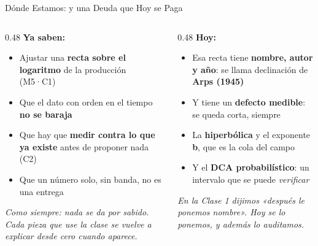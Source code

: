\documentclass[aspectratio=169, 11pt]{beamer}
\begin{document}
\begin{frame}[shrink=8]{Dónde Estamos: y una Deuda que Hoy se Paga}
  \vspace{-4pt}
  \begin{columns}[T]
    \begin{column}{0.48\textwidth}
      {\small\color{arcaDark}\bfseries\faCheckCircle\hspace{5pt}Ya saben:}
      \vspace{4pt}
      {\footnotesize\color{textMuted}
      \begin{itemize}\setlength{\itemsep}{3pt}
        \item[{\color{codeGreen}\scriptsize\faCheck}]
          Ajustar una \textbf{recta sobre el logaritmo} de la producción (M5·C1)
        \item[{\color{codeGreen}\scriptsize\faCheck}]
          Que el dato con orden en el tiempo \textbf{no se baraja}
        \item[{\color{codeGreen}\scriptsize\faCheck}]
          Que hay que \textbf{medir contra lo que ya existe} antes de proponer nada (C2)
        \item[{\color{codeGreen}\scriptsize\faCheck}]
          Que un número solo, sin banda, no es una entrega
      \end{itemize}
      }
      \vspace{5pt}
      {\scriptsize\color{textMuted}\itshape
        Como siempre: nada se da por sabido. Cada pieza que use la clase
        se vuelve a explicar desde cero cuando aparece.}
    \end{column}
    \begin{column}{0.48\textwidth}
      {\small\color{arcaDark}\bfseries\faForward\hspace{5pt}Hoy:}
      \vspace{4pt}
      {\footnotesize\color{textMuted}
      \begin{itemize}\setlength{\itemsep}{3pt}
        \item[{\color{arcaRed}\scriptsize\faArrowRight}]
          Esa recta tiene \textbf{nombre, autor y año}: se llama declinación de
          \textbf{Arps (1945)}
        \item[{\color{arcaRed}\scriptsize\faArrowRight}]
          Y tiene un \textbf{defecto medible}: se queda corta, siempre
        \item[{\color{arcaRed}\scriptsize\faArrowRight}]
          La \textbf{hiperbólica} y el exponente \textbf{b}, que es la cola del campo
        \item[{\color{arcaRed}\scriptsize\faStar}]
          Y el \textbf{DCA probabilístico}: un intervalo que se puede
          \emph{verificar}
      \end{itemize}
      }
      \vspace{4pt}
      {\scriptsize\color{arcaDark}\itshape
        En la Clase 1 dijimos «después le ponemos nombre».
        Hoy se lo ponemos, y además lo auditamos.}
    \end{column}
  \end{columns}
\end{frame}
\end{document}
